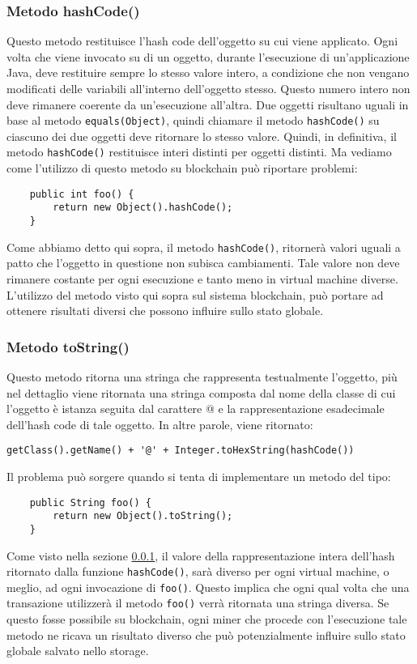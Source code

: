 			\subsubsection{Metodo hashCode()}
			\label{object-hashcode}
				Questo metodo restituisce l'hash code dell'oggetto su cui viene applicato. Ogni volta che viene invocato su di un oggetto, durante l'esecuzione di un'applicazione Java, deve restituire sempre lo stesso valore intero, a condizione che non vengano modificati delle variabili all'interno dell'oggetto stesso. Questo numero intero non deve rimanere coerente da un'esecuzione all'altra. Due oggetti risultano uguali in base al metodo \lstinline|equals(Object)|, quindi chiamare il metodo \lstinline|hashCode()| su ciascuno dei due oggetti deve ritornare lo stesso valore. Quindi, in definitiva, il metodo \lstinline|hashCode()| restituisce interi distinti per oggetti distinti. Ma vediamo come l'utilizzo di questo metodo su blockchain può riportare problemi:
				\begin{lstlisting}
	public int foo() {
		return new Object().hashCode();
	}
				\end{lstlisting}
				Come abbiamo detto qui sopra, il metodo \lstinline|hashCode()|, ritornerà valori uguali a patto che l'oggetto in questione non subisca cambiamenti. Tale valore non deve rimanere costante per ogni esecuzione e tanto meno in virtual machine diverse. L'utilizzo del metodo visto qui sopra sul sistema blockchain, può portare ad ottenere risultati diversi che possono influire sullo stato globale.
			
			\subsubsection{Metodo toString()}
				Questo metodo ritorna una stringa che rappresenta testualmente l'oggetto, più nel dettaglio viene ritornata una stringa composta dal nome della classe di cui l'oggetto è istanza seguita dal carattere @ e la rappresentazione esadecimale dell'hash code di tale oggetto. In altre parole, viene ritornato:
				\begin{lstlisting}[numbers=none,frame=none]
	getClass().getName() + '@' + Integer.toHexString(hashCode())
				\end{lstlisting}
				Il problema può sorgere quando si tenta di implementare un metodo del tipo:
				\begin{lstlisting}
	public String foo() {
		return new Object().toString();
	}
				\end{lstlisting}
				Come visto nella sezione \ref{object-hashcode}, il valore della rappresentazione intera dell'hash ritornato dalla funzione \lstinline|hashCode()|, sarà diverso per ogni virtual machine, o meglio, ad ogni invocazione di \lstinline|foo()|. Questo implica che ogni qual volta che una transazione utilizzerà il metodo \lstinline|foo()| verrà ritornata una stringa diversa. Se questo fosse possibile su blockchain, ogni miner che procede con l'esecuzione tale metodo ne ricava un risultato diverso che può potenzialmente influire sullo stato globale salvato nello storage.
